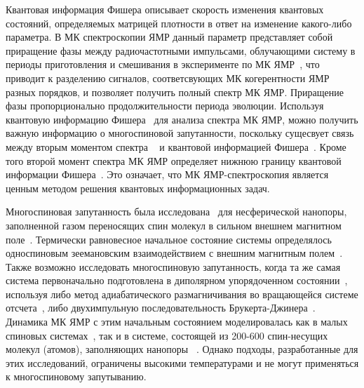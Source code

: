\documentclass[utf8]{jetp}
\begin{document}
Квантовая информация Фишера описывает скорость изменения квантовых состояний, определяемых матрицей плотности в ответ на изменение какого-либо параметра.
В МК спектроскопии ЯМР данный параметр представляет собой приращение фазы между радиочастотными импульсами, облучающими систему в периоды приготовления и смешивания в эксперименте по МК ЯМР~\cite{Baum_1985}, 
что приводит к разделению сигналов, соответсвующих МК когерентности ЯМР разных порядков, и позволяет получить полный спектр МК ЯМР. 
Приращение фазы пропорционально продолжительности периода эволюции.
Используя квантовую информацию Фишера~\cite{Liu_2014} для анализа спектра МК ЯМР, можно получить важную информацию о многоспиновой запутанности,
поскольку сущесвует связь между вторым моментом спектра ~\cite{Khitrin_1997} и квантовой информацией Фишера~\cite{G_rttner_2018,Doronin_2019}.
Кроме того второй момент спектра МК ЯМР определяет нижнюю границу квантовой информации Фишера~\cite{G_rttner_2018}.
Это означает, что МК ЯМР-спектроскопия является ценным методом решения квантовых информационных задач.

Многоспиновая запутанность была исследована~\cite{Doronin_2019} для несферической нанопоры, заполненной газом переносящих спин молекул в сильном внешнем магнитном поле~\cite{Baugh_2001,Doronin_2009}.
Термически равновесное начальное состояние системы определялось односпиновым зеемановским взаимодействием с внешним магнитным полем~\cite{Doronin_2007a}.
Также возможно исследовать многоспиновую запутанность, когда та же самая система первоначально подготовлена в диполярном упорядоченном состоянии~\cite{Goldman_1970}, используя либо метод адиабатического размагничивания во вращающейся системе отсчета~\cite{Goldman_1970, Slichter_1961}, либо двухимпульную последовательность Брукерта-Джинера~\cite{Goldman_1970, Jeener_1967}.
Динамика МК ЯМР с этим начальным состоянием моделировалась как в малых спиновых системах~\cite{Doronin_2007a, Doronin_2007b}, так и в системе, состоящей из 200-600 спин-несущих молекул (атомов), заполняющих нанопоры ~\cite{Doronin_2011}.
Однако подходы, разработанные для этих исследований, ограничены высокими температурами и не могут применяться к многоспиновому запутыванию.
\end{document}
